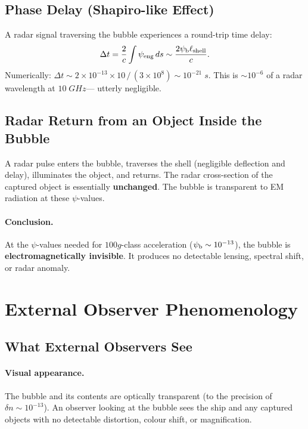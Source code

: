 \documentclass[12pt,aps,prd,superscriptaddress,nofootinbib]{revtex4-2}
\newcommand{\psib}{\psi_{\rm b}}
\newcommand{\Lshell}{\ell_{\rm shell}}
\begin{document}
\subsection{Phase Delay (Shapiro-like Effect)}

A radar signal traversing the bubble experiences a round-trip
time delay:
\begin{equation}
\Delta t = \frac{2}{c}\int \psi_{\rm eng}\,ds
\sim \frac{2\psib\Lshell}{c}.
\end{equation}
Numerically: $\Delta t \sim 2\times 10^{-13}\times 10\,/\,
(3\times 10^8) \sim 10^{-21}\;\si{s}$. This is
$\sim 10^{-6}$ of a radar wavelength at $10\;\si{GHz}$---
utterly negligible.

\subsection{Radar Return from an Object Inside the Bubble}

A radar pulse enters the bubble, traverses the shell
(negligible deflection and delay), illuminates the object, and
returns. The radar cross-section of the captured object is
essentially \textbf{unchanged}. The bubble is transparent to EM
radiation at these $\psi$-values.

\paragraph{Conclusion.}
At the $\psi$-values needed for $100g$-class acceleration
($\psib \sim 10^{-13}$), the bubble is \textbf{electromagnetically
invisible}. It produces no detectable lensing, spectral shift,
or radar anomaly.


\section{External Observer Phenomenology}\label{sec:observables}

\subsection{What External Observers See}

\paragraph{Visual appearance.}
The bubble and its contents are optically transparent (to the
precision of $\delta n \sim 10^{-13}$). An observer looking at the
bubble sees the ship and any captured objects with no detectable
distortion, colour shift, or magnification.
\end{document}
